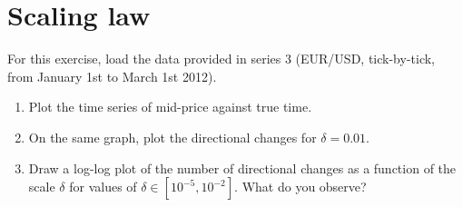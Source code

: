 \section{Scaling law}

For this exercise, load the data provided in series 3 (EUR/USD, tick-by-tick, from January 1st to March 1st 2012). 

\begin{enumerate}
    \item Plot the time series of mid-price against true time. 
    \item On the same graph, plot the directional changes for $\delta = 0.01$.
    \item Draw a log-log plot of the number of directional changes as a function of the scale $\delta$ for values of  $\delta \in [10^{-5}, 10^{-2}]$. What do you observe? 
\end{enumerate}



